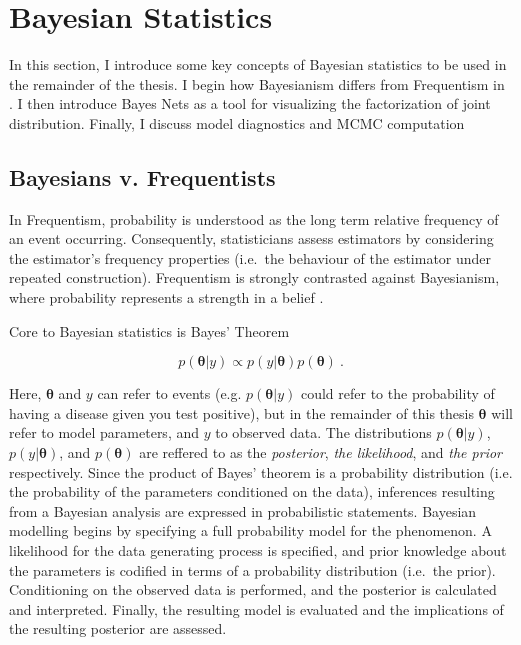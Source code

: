 \section{Bayesian Statistics}

In this section, I introduce some key concepts of Bayesian statistics to be used in the remainder of the thesis.  I begin  how Bayesianism differs from Frequentism in .  I then introduce Bayes Nets as a tool for visualizing the factorization of joint distribution.  Finally, I discuss  model diagnostics and MCMC computation 


\subsection{Bayesians v. Frequentists}
In Frequentism, probability is understood as the long term relative frequency of an event occurring.  Consequently, statisticians assess estimators by considering the estimator's frequency properties (i.e.\ the behaviour of the estimator under repeated construction).  Frequentism is strongly contrasted against Bayesianism, where probability represents a strength in a belief \cite{gelman2013bayesian}.

Core to Bayesian statistics is Bayes' Theorem 

\begin{equation}\label{Bayes}
	p( \bm{\theta} \vert y) \propto p(y \vert \bm{\theta}) p(\bm{\theta}) \>.
\end{equation}

\noindent  Here, $ \bm{\theta} $  and $y$ can refer to events (e.g. $p(\bm{\theta} \vert y)$ could refer to the probability of having a disease given you test positive), but in the remainder of this thesis $\bm{\theta}$ will refer to model parameters, and $ y $ to observed data.  The distributions $ p( \bm{\theta} \vert y) $, $ p(y \vert \bm{\theta}) $, and $p(\bm{\theta})$ are reffered to as the \textit{posterior}, \textit{the likelihood}, and \textit{the prior} respectively.  Since the product of Bayes' theorem is a probability distribution (i.e. the probability of the parameters conditioned on the data), inferences resulting from a Bayesian analysis are expressed in probabilistic statements. Bayesian modelling begins by specifying a full probability model for the phenomenon.  A likelihood for the data generating process is specified, and prior knowledge about the parameters is codified in terms of a probability distribution (i.e.\ the prior).  Conditioning on the observed data is performed, and the posterior is calculated and interpreted.  Finally, the resulting model is evaluated and the implications of the resulting posterior are assessed.  

